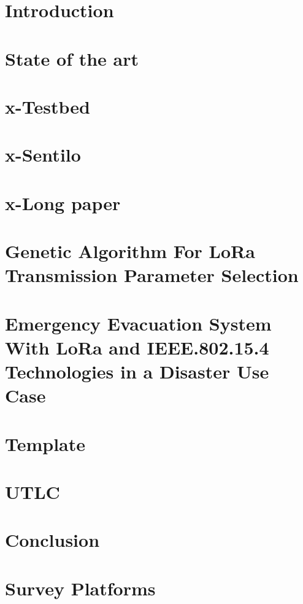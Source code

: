 


\def\printbib{\Printbibliography{Gateway selection}{Network selection}{Configuration selection}{Measurement}{Platform}{Weather}{LPWAN}{}{}}


\begin{refsection}
\preface
\body


\chapter[01]{Introduction}
\chapter[02]{State of the art}
\chapter[03]{x-Testbed}
\chapter[04]{x-Sentilo}
\chapter[05]{x-Long paper}
\chapter[06]{Genetic Algorithm For LoRa Transmission Parameter Selection}
\chapter[21]{Emergency Evacuation System With LoRa and IEEE.802.15.4 Technologies in a Disaster Use Case}
\chapter[07]{Template}
\chapter[08]{UTLC}
\chapter[09]{Conclusion}
\chapter[A]{Survey Platforms}



\end{refsection}
